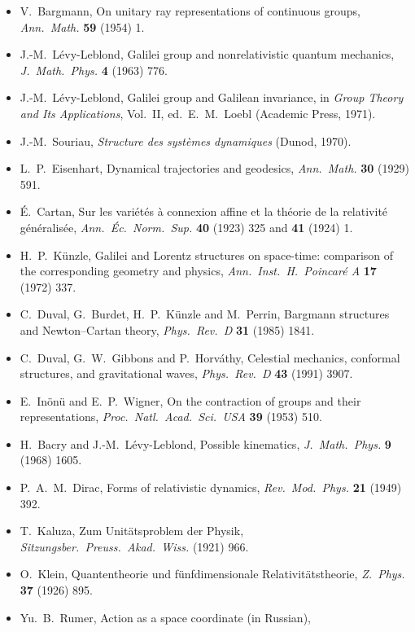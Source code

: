 \begin{itemize}
\item V.~Bargmann, On unitary ray representations of continuous groups,
      \emph{Ann.\ Math.} \textbf{59} (1954) 1.
\item J.-M.~L\'evy-Leblond, Galilei group and nonrelativistic quantum mechanics,
      \emph{J.\ Math.\ Phys.} \textbf{4} (1963) 776.
\item J.-M.~L\'evy-Leblond, Galilei group and Galilean invariance, in
      \emph{Group Theory and Its Applications}, Vol.~II, ed.\ E.~M.~Loebl
      (Academic Press, 1971).
\item J.-M.~Souriau, \emph{Structure des syst\`emes dynamiques} (Dunod, 1970).
\item L.~P.~Eisenhart, Dynamical trajectories and geodesics,
      \emph{Ann.\ Math.} \textbf{30} (1929) 591.
\item \'E.~Cartan, Sur les vari\'et\'es \`a connexion affine et la th\'eorie de la
      relativit\'e g\'en\'eralis\'ee, \emph{Ann.\ \'Ec.\ Norm.\ Sup.}
      \textbf{40} (1923) 325 and \textbf{41} (1924) 1.
\item H.~P.~K\"unzle, Galilei and Lorentz structures on space-time:
      comparison of the corresponding geometry and physics,
      \emph{Ann.\ Inst.\ H.\ Poincar\'e A} \textbf{17} (1972) 337.
\item C.~Duval, G.~Burdet, H.~P.~K\"unzle and M.~Perrin, Bargmann structures and
      Newton--Cartan theory, \emph{Phys.\ Rev.\ D} \textbf{31} (1985) 1841.
\item C.~Duval, G.~W.~Gibbons and P.~Horv\'athy, Celestial mechanics, conformal
      structures, and gravitational waves, \emph{Phys.\ Rev.\ D} \textbf{43}
      (1991) 3907.
\item E.~In\"on\"u and E.~P.~Wigner, On the contraction of groups and their
      representations, \emph{Proc.\ Natl.\ Acad.\ Sci.\ USA} \textbf{39} (1953) 510.
\item H.~Bacry and J.-M.~L\'evy-Leblond, Possible kinematics,
      \emph{J.\ Math.\ Phys.} \textbf{9} (1968) 1605.
\item P.~A.~M.~Dirac, Forms of relativistic dynamics,
      \emph{Rev.\ Mod.\ Phys.} \textbf{21} (1949) 392.
\item T.~Kaluza, Zum Unit\"atsproblem der Physik, \emph{Sitzungsber.\ Preuss.\ Akad.\ Wiss.}
      (1921) 966.
\item O.~Klein, Quantentheorie und f\"unfdimensionale Relativit\"atstheorie,
      \emph{Z.\ Phys.} \textbf{37} (1926) 895.
\item Yu.~B.~Rumer, Action as a space coordinate (in Russian),

\end{itemize}
